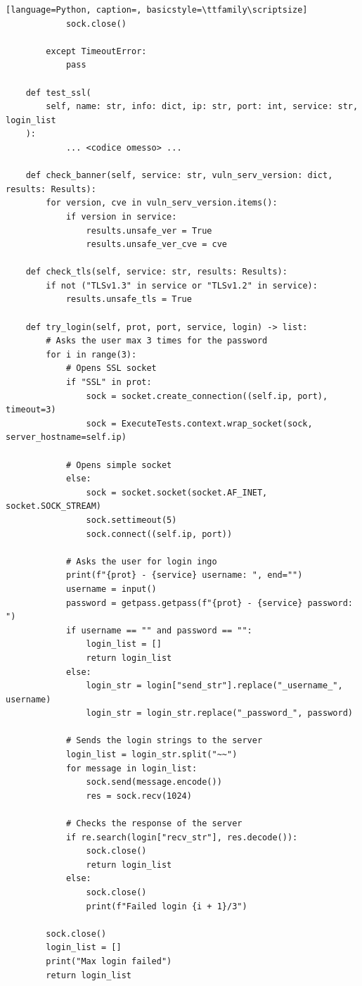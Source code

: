 \documentclass[12pt]{report}
\begin{document}
\begin{lstlisting}[language=Python, caption=, basicstyle=\ttfamily\scriptsize]
            sock.close()

        except TimeoutError:
            pass

    def test_ssl(
        self, name: str, info: dict, ip: str, port: int, service: str, login_list
    ):
            ... <codice omesso> ...
            
    def check_banner(self, service: str, vuln_serv_version: dict, results: Results):
        for version, cve in vuln_serv_version.items():
            if version in service:
                results.unsafe_ver = True
                results.unsafe_ver_cve = cve

    def check_tls(self, service: str, results: Results):
        if not ("TLSv1.3" in service or "TLSv1.2" in service):
            results.unsafe_tls = True

    def try_login(self, prot, port, service, login) -> list:
        # Asks the user max 3 times for the password
        for i in range(3):
            # Opens SSL socket
            if "SSL" in prot:
                sock = socket.create_connection((self.ip, port), timeout=3)
                sock = ExecuteTests.context.wrap_socket(sock, server_hostname=self.ip)

            # Opens simple socket
            else:
                sock = socket.socket(socket.AF_INET, socket.SOCK_STREAM)
                sock.settimeout(5)
                sock.connect((self.ip, port))

            # Asks the user for login ingo
            print(f"{prot} - {service} username: ", end="")
            username = input()
            password = getpass.getpass(f"{prot} - {service} password: ")
            if username == "" and password == "":
                login_list = []
                return login_list
            else:
                login_str = login["send_str"].replace("_username_", username)
                login_str = login_str.replace("_password_", password)

            # Sends the login strings to the server
            login_list = login_str.split("~~")
            for message in login_list:
                sock.send(message.encode())
                res = sock.recv(1024)

            # Checks the response of the server
            if re.search(login["recv_str"], res.decode()):
                sock.close()
                return login_list
            else:
                sock.close()
                print(f"Failed login {i + 1}/3")

        sock.close()
        login_list = []
        print("Max login failed")
        return login_list
\end{lstlisting}
\end{document}

